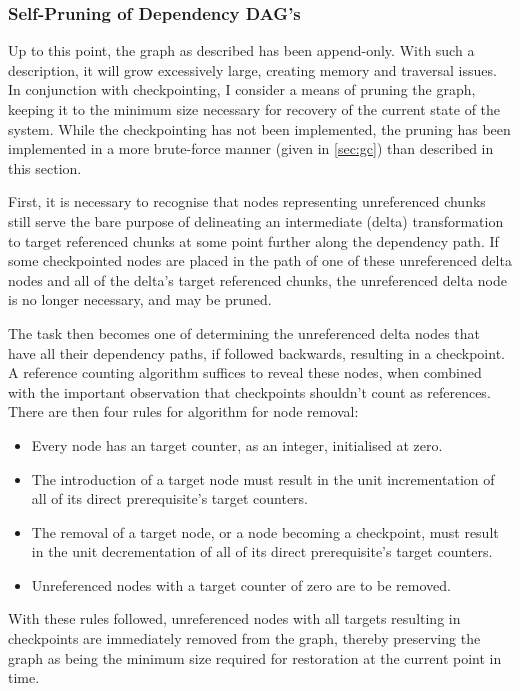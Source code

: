 \subsubsection{Self-Pruning of Dependency DAG's}

Up to this point, the graph as described has been append-only.
With such a description, it will grow excessively large, creating memory and traversal issues.
In conjunction with checkpointing, I consider a means of pruning the graph, keeping it to the minimum size necessary for recovery of the current state of the system.
While the checkpointing has not been implemented, the pruning has been implemented in a more brute-force manner (given in \cref{sec:gc}) than described in this section.

First, it is necessary to recognise that nodes representing unreferenced chunks still serve the bare purpose of delineating an intermediate (delta) transformation to target referenced chunks at some point further along the dependency path\cite{mogul2002deltahttp}.
If some checkpointed nodes are placed in the path of one of these unreferenced delta nodes and all of the delta's target referenced chunks, the unreferenced delta node is no longer necessary, and may be pruned.

The task then becomes one of determining the unreferenced delta nodes that have all their dependency paths, if followed backwards, resulting in a checkpoint.
A reference counting algorithm suffices to reveal these nodes, when combined with the important observation that checkpoints shouldn't count as references.
There are then four rules for algorithm for node removal: \begin{itemize} \item Every node has an target counter, as an integer, initialised at zero.
	\item The introduction of a target node must result in the unit incrementation of all of its direct prerequisite's target counters.
	\item The removal of a target node, or a node becoming a checkpoint, must result in the unit decrementation of all of its direct prerequisite's target counters.
	\item Unreferenced nodes with a target counter of zero are to be removed.
\end{itemize}
With these rules followed, unreferenced nodes with all targets resulting in checkpoints are immediately removed from the graph, thereby preserving the graph as being the minimum size required for restoration at the current point in time.

